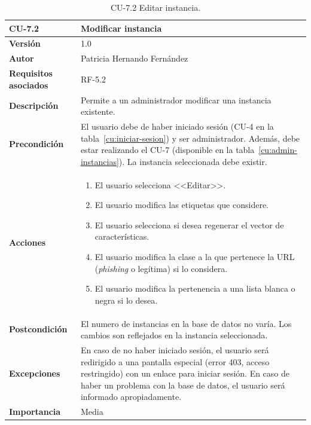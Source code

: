 \begin{table}[p]
	\centering
	\begin{tabularx}{\linewidth}{ p{} p{} }
		\toprule
		\textbf{CU-7.2}    & \textbf{Modificar instancia}\\
		\toprule
		\textbf{Versión}              & 1.0    \\
		\textbf{Autor}                & Patricia Hernando Fernández \\
		\textbf{Requisitos asociados} & RF-5.2 \\
		\textbf{Descripción}          & Permite a un administrador modificar una instancia existente.\\
		\textbf{Precondición}         & El usuario debe de haber iniciado sesión (CU-4 en la tabla~\ref{cu:iniciar-sesion}) y ser administrador. Además, debe estar realizando el CU-7 (disponible en la tabla~\ref{cu:admin-instancias}). La instancia seleccionada debe existir. \\
		\textbf{Acciones}             &
		\begin{enumerate}
			\def\labelenumi{\arabic{enumi}.}
			\tightlist
			\item El usuario selecciona <<Editar>>.
			\item El usuario modifica las etiquetas que considere.
			\item El usuario selecciona si desea regenerar el vector de características.
			\item El usuario modifica la clase a la que pertenece la URL (\textit{phishing} o legítima) si lo considera.
			\item El usuario modifica la pertenencia a una lista blanca o negra si lo desea.
		\end{enumerate}\\
		\textbf{Postcondición}        & El numero de instancias en la base de datos no varía. Los cambios son reflejados en la instancia seleccionada. \\
		\textbf{Excepciones}          & En caso de no haber iniciado sesión, el usuario será redirigido a una pantalla especial (error 403, acceso restringido) con un enlace para iniciar sesión. En caso de haber un problema con la base de datos, el usuario será informado apropiadamente.\\
		\textbf{Importancia}          & Media \\
		\bottomrule
	\end{tabularx}
	\caption{CU-7.2 Editar instancia.}
	\label{cu:editar-instancia}
\end{table}

